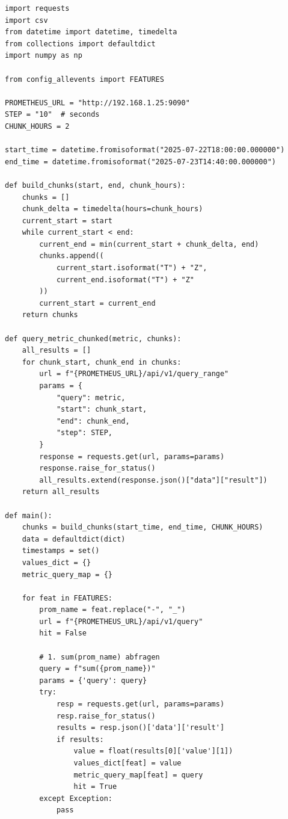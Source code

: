 \begin{lstlisting}[caption={Python script for scraping performance monitoring from Prometheus into an csv file}, label={lst:prometheustocsv_scraper}]
import requests
import csv
from datetime import datetime, timedelta
from collections import defaultdict
import numpy as np

from config_allevents import FEATURES

PROMETHEUS_URL = "http://192.168.1.25:9090"
STEP = "10"  # seconds
CHUNK_HOURS = 2

start_time = datetime.fromisoformat("2025-07-22T18:00:00.000000")
end_time = datetime.fromisoformat("2025-07-23T14:40:00.000000")

def build_chunks(start, end, chunk_hours):
    chunks = []
    chunk_delta = timedelta(hours=chunk_hours)
    current_start = start
    while current_start < end:
        current_end = min(current_start + chunk_delta, end)
        chunks.append((
            current_start.isoformat("T") + "Z",
            current_end.isoformat("T") + "Z"
        ))
        current_start = current_end
    return chunks

def query_metric_chunked(metric, chunks):
    all_results = []
    for chunk_start, chunk_end in chunks:
        url = f"{PROMETHEUS_URL}/api/v1/query_range"
        params = {
            "query": metric,
            "start": chunk_start,
            "end": chunk_end,
            "step": STEP,
        }
        response = requests.get(url, params=params)
        response.raise_for_status()
        all_results.extend(response.json()["data"]["result"])
    return all_results

def main():
    chunks = build_chunks(start_time, end_time, CHUNK_HOURS)
    data = defaultdict(dict)
    timestamps = set()
    values_dict = {}
    metric_query_map = {}

    for feat in FEATURES:
        prom_name = feat.replace("-", "_")
        url = f"{PROMETHEUS_URL}/api/v1/query"
        hit = False

        # 1. sum(prom_name) abfragen
        query = f"sum({prom_name})"
        params = {'query': query}
        try:
            resp = requests.get(url, params=params)
            resp.raise_for_status()
            results = resp.json()['data']['result']
            if results:
                value = float(results[0]['value'][1])
                values_dict[feat] = value
                metric_query_map[feat] = query
                hit = True
        except Exception:
            pass


\end{lstlisting}
